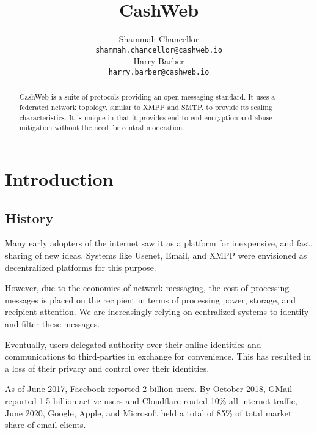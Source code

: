 \documentclass{article}
\title{CashWeb}
\author{
 Shammah Chancellor \\
 \texttt{shammah.chancellor@cashweb.io} \\
 \And
 Harry Barber \\
 \texttt{harry.barber@cashweb.io} \\
}
\begin{document}
\maketitle

\begin{abstract}
CashWeb is a suite of protocols providing an open messaging standard. It uses a federated network topology, similar to XMPP and SMTP, to provide its scaling characteristics. It is unique in that it provides end-to-end encryption and abuse mitigation without the need for central moderation.
\end{abstract}

\section{Introduction}

\subsection{History}

Many early adopters of the internet saw it as a platform for inexpensive, and fast, sharing of new ideas. Systems like Usenet\cite{rfc5536}\cite{rfc5537}, Email\cite{rfc5322}\cite{rfc1939}\cite{rfc5321}\cite{rfc4551}, and XMPP\cite{rfc3920}\cite{rfc3921}\cite{rfc3922}\cite{rfc3923} were envisioned as decentralized platforms for this purpose.


However, due to the economics of network messaging, the cost of processing messages is placed on the recipient in terms of processing power, storage, and recipient attention. We are increasingly relying on centralized systems to identify and filter these messages. 

Eventually, users delegated authority over their online identities and communications to third-parties in exchange for convenience. This has resulted in a loss of their privacy and control over their identities.

As of June 2017, Facebook reported 2 billion users. By October 2018, GMail reported 1.5 billion active users\cite{gmail2018} and Cloudflare routed 10\% all internet traffic\cite{cloudflare2018}, June 2020, Google, Apple, and Microsoft held a total of 85\% of total market share of email clients\cite{emailshare2020}.
\end{document}
